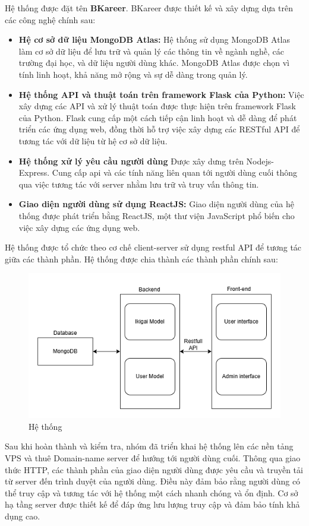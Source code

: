 Hệ thống được đặt tên \textbf{BKareer}.
BKareer được thiết kế và xây dựng dựa trên các công nghệ chính sau:
\begin{itemize}
    \item \textbf{Hệ cơ sở dữ liệu MongoDB Atlas:} Hệ thống sử dụng MongoDB Atlas làm cơ sở dữ liệu để lưu trữ và quản lý các thông tin về ngành nghề, các trường đại học, và dữ liệu người dùng khác. MongoDB Atlas được chọn vì tính linh hoạt, khả năng mở rộng và sự dễ dàng trong quản lý.
    \item \textbf{Hệ thống API và thuật toán trên framework Flask của Python:} Việc xây dựng các API và xử lý thuật toán được thực hiện trên framework Flask của Python. Flask cung cấp một cách tiếp cận linh hoạt và dễ dàng để phát triển các ứng dụng web, đồng thời hỗ trợ việc xây dựng các RESTful API để tương tác với dữ liệu từ hệ cơ sở dữ liệu.
    \item \textbf{Hệ thống xử lý yêu cầu người dùng} Được xây dưng trên Nodejs-Express. Cung cấp api và các tính năng liên quan tới người dùng cuối thông qua việc tương tác với server nhằm lưu trữ và truy vấn thông tin. 
    \item \textbf{Giao diện người dùng sử dụng ReactJS:} Giao diện người dùng của hệ thống được phát triển bằng ReactJS, một thư viện JavaScript phổ biến cho việc xây dựng các ứng dụng web.
\end{itemize}

Hệ thống được tổ chức theo cơ chế client-server sử dụng restful API để tương tác giữa các thành phần. Hệ thống được chia thành các thành phần chính sau:
\begin{figure}[H]
    \centering
    \includegraphics[width=0.5\linewidth]{images/sys.png}
    \vspace{0.5cm}
    \caption{Hệ thống}
\end{figure}

Sau khi hoàn thành và kiểm tra, nhóm đã triển khai hệ thống lên các nền tảng VPS và thuê Domain-name server để hướng tới người dùng cuối. Thông qua giao thức HTTP, các thành phần của giao diện người dùng được yêu cầu và truyền tải từ server đến trình duyệt của người dùng. Điều này đảm bảo rằng người dùng có thể truy cập và tương tác với hệ thống một cách nhanh chóng và ổn định. Cơ sở hạ tầng server được thiết kế để đáp ứng lưu lượng truy cập và đảm bảo tính khả dụng cao.

